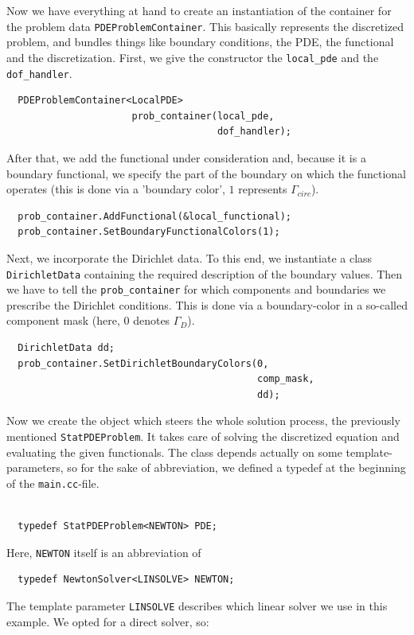\documentclass[smallextended]{svjour3}       %
\numberwithin{equation}{section}
\begin{document}
Now we have everything at hand to create an instantiation of the container for the problem data \texttt{PDEProblemContainer}. This basically represents the discretized problem, and bundles things like boundary conditions, the PDE, the functional and the discretization. First, we give the constructor the \texttt{local\_pde} and the \texttt{dof\_handler}.
\begin{lstlisting}
  PDEProblemContainer<LocalPDE> 
                      prob_container(local_pde,
                                     dof_handler);                                            
\end{lstlisting}
After that, we add the functional under consideration and, because it is a boundary functional, we specify the part of the boundary on which the functional operates (this is done via a 'boundary color', $1$ represents $\Gamma_{circ}$).
\begin{lstlisting}
  prob_container.AddFunctional(&local_functional);
  prob_container.SetBoundaryFunctionalColors(1);
\end{lstlisting}
Next, we incorporate the Dirichlet data. To this end, we instantiate a 
class \texttt{DirichletData} containing the required description of the 
boundary values. Then we have to tell the \texttt{prob\_container} for
which components and boundaries we prescribe the Dirichlet conditions. This is
done via a boundary-color in a so-called component mask 
(here, $0$ denotes $\Gamma_D$).
\begin{lstlisting}
  DirichletData dd;
  prob_container.SetDirichletBoundaryColors(0,
                                            comp_mask,
                                            dd);
\end{lstlisting}
Now we create the object which steers the whole solution process, the previously mentioned \texttt{StatPDEProblem}. It takes care of solving the discretized equation and evaluating the given functionals. The class depends actually on some template-parameters, so for the sake of abbreviation, we defined a typedef at the beginning of the \texttt{main.cc}-file.
\begin{lstlisting}

  typedef StatPDEProblem<NEWTON> PDE;

\end{lstlisting}
Here, \texttt{NEWTON} itself is an abbreviation of
\begin{lstlisting}
  typedef NewtonSolver<LINSOLVE> NEWTON;
\end{lstlisting}
The  template parameter \texttt{LINSOLVE} describes which linear solver we use in this example. We opted for a direct solver, so: 
\end{document}
